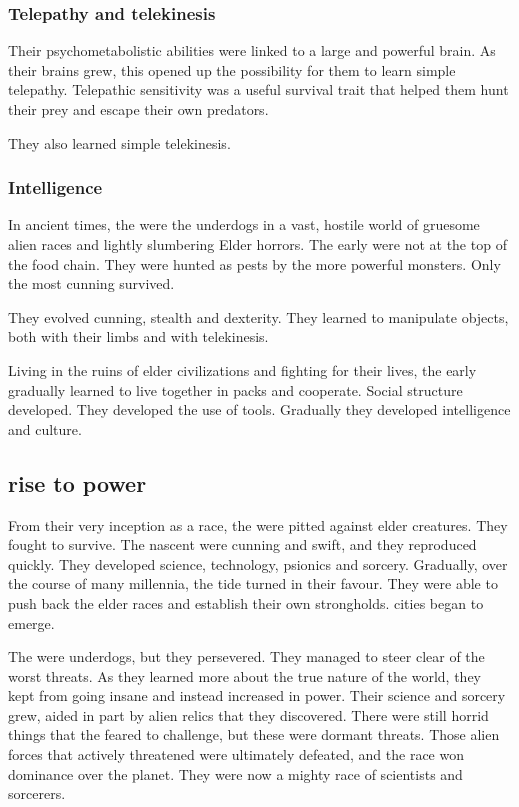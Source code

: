 \subsubsection{Telepathy and telekinesis}
Their psychometabolistic abilities were linked to a large and powerful brain. 
As their brains grew, this opened up the possibility for them to learn simple telepathy. 
Telepathic sensitivity was a useful survival trait that helped them hunt their prey and escape their own predators. 

They also learned simple telekinesis. 





\subsubsection{Intelligence}
In ancient times, the \ophidians were the underdogs in a vast, hostile world of gruesome alien races and lightly slumbering Elder horrors.
The early \ophidians were not at the top of the food chain. 
They were hunted as pests by the more powerful monsters. 
Only the most cunning \ophidians survived. 

They evolved cunning, stealth and dexterity. 
They learned to manipulate objects, both with their limbs and with telekinesis. 

Living in the ruins of elder civilizations and fighting for their lives, the early \ophidians gradually learned to live together in packs and cooperate. 
Social structure developed. 
They developed the use of tools. 
Gradually they developed intelligence and culture. 









\subsection{\Ophidian rise to power}
From their very inception as a race, the \ophidians were pitted against elder creatures. 
They fought to survive. 
The nascent \ophidians were cunning and swift, and they reproduced quickly. 
They developed science, technology, psionics and sorcery.
Gradually, over the course of many millennia, the tide turned in their favour. 
They were able to push back the elder races and establish their own strongholds.
\Ophidian cities began to emerge. 

The \ophidians were underdogs, but they persevered. 
They managed to steer clear of the worst threats. 
As they learned more about the true nature of the world, they kept from going insane and instead increased in power. 
Their science and sorcery grew, aided in part by alien relics that they discovered. 
There were still horrid things that the \ophidians feared to challenge, but these were dormant threats. 
Those alien forces that actively threatened were ultimately defeated, and the \ophidian race won dominance over the planet. 
They were now a mighty race of scientists and sorcerers.

